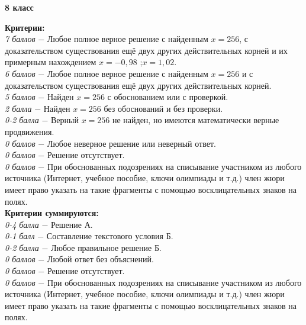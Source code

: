 \centerline{\bf \Huge 8 класс}

 \textbf{Критерии:} \\
\textit{7 баллов} $-$ Любое полное верное решение с найденным $x=256$, с доказательством существования ещё двух других действительных корней и их примерным нахождением $x=-0,98$ ;$x=1,02$.\\
\textit{6 баллов} $-$ Любое полное верное решение с найденным $x=256$ и с доказательством существования ещё двух других действительных корней.\\
\textit{5 баллов} $-$ Найден $x=256$ с обоснованием или с проверкой.\\
\textit{2 балла} $-$ Найден $x=256$ без обоснований и без проверки.\\
\textit{0-2 балла} $-$ Верный $x=256$ не найден, но имеются математически верные продвижения.\\
\textit{0 баллов} $-$ Любое неверное решение или неверный ответ.\\
\textit{0 баллов} $-$ Решение отсутствует.\\
\textit{0 баллов} $-$ При обоснованных подозрениях на списывание участником из любого источника (Интернет, учебное пособие, ключи олимпиады и т.д.) член жюри имеет право указать на такие фрагменты с помощью восклицательных знаков на полях. \\

 \textbf{Критерии суммируются:} \\
\textit{0-4 балла} $-$ Решение А.\\
\textit{0-1 балл} $-$ Составление текстового условия Б.\\
\textit{0-2 балла} $-$ Любое правильное решение Б.\\
\textit{0 баллов} $-$ Любой ответ без объяснений.\\
\textit{0 баллов} $-$ Решение отсутствует.\\
\textit{0 баллов} $-$ При обоснованных подозрениях на списывание участником из любого источника (Интернет, учебное пособие, ключи олимпиады и т.д.) член жюри имеет право указать на такие фрагменты с помощью восклицательных знаков на полях. \\



